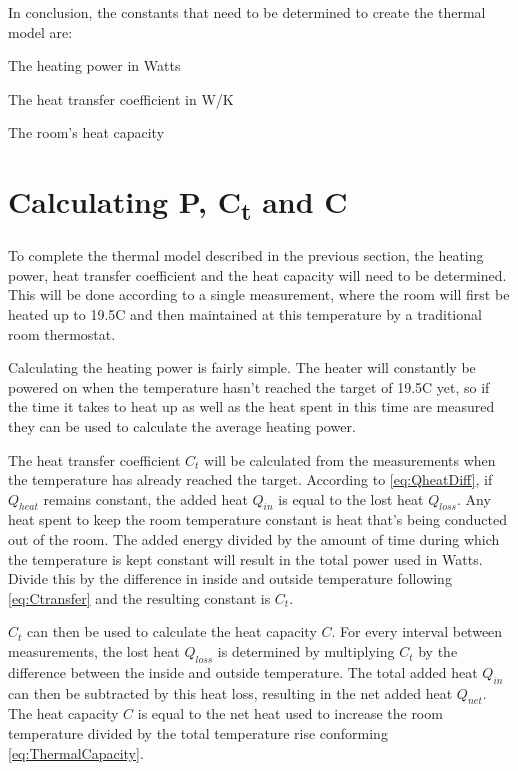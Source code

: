 \documentclass[12pt,a4paper,final]{report}
\begin{document}
In conclusion, the constants that need to be determined to create the thermal model are:
\begin{description} \label{variableDesc}
	\item[P] The heating power in Watts
	\item[$\mathbf{C_{t}}$] The heat transfer coefficient in W/K
	\item[C] The room's heat capacity
\end{description}

\section{Calculating P, C\textsubscript{t} and C} \label{sec:CalculatePUC}
To complete the thermal model described in the previous section, the heating power, heat transfer coefficient and the heat capacity will need to be determined. This will be done according to a single measurement, where the room will first be heated up to 19.5\degree{}C and then maintained at this temperature by a traditional room thermostat.

Calculating the heating power is fairly simple. The heater will constantly be powered on when the temperature hasn't reached the target of 19.5\degree{}C yet, so if the time it takes to heat up as well as the heat spent in this time are measured they can be used to calculate the average heating power.

The heat transfer coefficient $C_{t}$ will be calculated from the measurements when the temperature has already reached the target. According to \eqref{eq:QheatDiff}, if $Q_{heat}$ remains constant, the added heat $Q_{in}$ is equal to the lost heat $Q_{loss}$. Any heat spent to keep the room temperature constant is heat that's being conducted out of the room. The added energy divided by the amount of time during which the temperature is kept constant will result in the total power used in Watts. Divide this by the difference in inside and outside temperature following \eqref{eq:Ctransfer} and the resulting constant is $C_{t}$.

$C_{t}$ can then be used to calculate the heat capacity $C$. For every interval between measurements, the lost heat $Q_{loss}$ is determined by multiplying $C_{t}$ by the difference between the inside and outside temperature. The total added heat $Q_{in}$ can then be subtracted by this heat loss, resulting in the net added heat $Q_{net}$. The heat capacity $C$ is equal to the net heat used to increase the room temperature divided by the total temperature rise conforming \eqref{eq:ThermalCapacity}.
\end{document}
